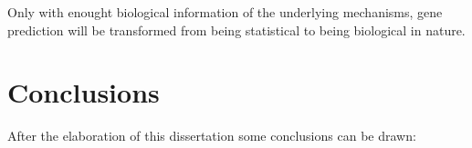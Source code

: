 


Only with enought biological information of the underlying mechanisms,
gene prediction will be transformed from being statistical to being
biological in nature. 




\chapter{Conclusions} 

After the elaboration of this dissertation some conclusions can be
drawn:

